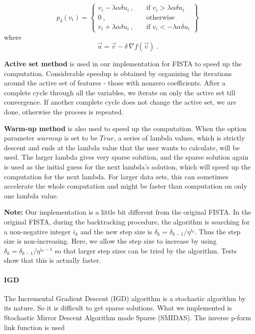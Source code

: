 \begin{equation}
p_\delta (v_i) = \left\{ \begin{array}{ll}
v_i - \lambda\alpha\delta u_i\ , \quad  & \mbox{if } v_i > \lambda\alpha\delta
u_i \\
0\ , \quad & \mbox{otherwise} \\
v_i + \lambda\alpha\delta u_i\ , \quad & \mbox{if } v_i < - \lambda\alpha\delta u_i
\end{array}
\right\}
\end{equation}
where
\begin{equation}
\vec{u} = \vec{v} - \delta\,\nabla f(\vec{v})\ .
\end{equation}

{\bf Active set method} is used in our implementation for FISTA to speed up the
computation. Considerable speedup is obtained by organizing the iterations
around the active set of features - those with nonzero coefficients. After a
complete cycle through all the variables, we iterate on only the active set till
convergence. If another complete cycle does not change the active set, we are
done, otherwise the process is repeated.

{\bf Warm-up method} is also used to speed up the computation. When the option
parameter $warmup$ is set to be $True$, a series of lambda values, which is
strictly descent and ends at the lambda value that the user wants to calculate,
will be used. The larger lambda gives very sparse solution, and the sparse
solution again is used as the initial guess for the next lambda's solution,
which will speed up the computation for the next lambda. For larger data sets,
this can sometimes accelerate the whole computation and might be faster than
computation on only one lambda value.

{\bf Note:} Our implementation is a little bit different from the original
FISTA. In the original FISTA, during the backtracking procedure, the algorithm
is searching for a non-negative integer $i_k$ and the new step size is $\delta_k
= \delta_{k-1}/\eta^{i_k}$. Thus the step size is non-increasing. Here, we allow
the step size to increase by using $\delta_k = \delta_{k-1}/\eta^{i_k-1}$ so
that larger step sizes can be tried by the algorithm. Tests show that this is
actually faster.

\paragraph{IGD}

The Incremental Gradient Descent (IGD) algorithm is a stochastic algorithm by
its nature. So it is difficult to get sparse solutions. What we implemented is
Stochastic Mirror Descent Algorithm made Sparse (SMIDAS). The inverse p-form
link function is used

